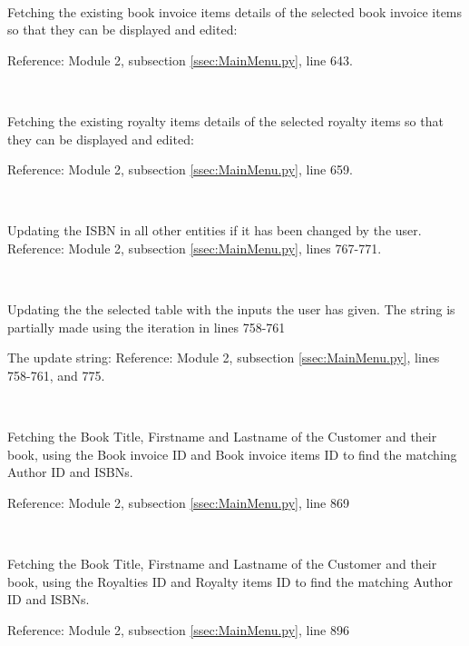 \

Fetching the existing book invoice items details of the selected book invoice items so that they can be displayed and edited:
\begin{tiny}
\end{tiny}
Reference: Module 2,  subsection \ref{ssec:MainMenu.py}, line 643.

\

Fetching the existing royalty items details of the selected royalty items so that they can be displayed and edited:
\begin{tiny}
\end{tiny}
Reference: Module 2,  subsection \ref{ssec:MainMenu.py}, line 659.

\

Updating the ISBN in all other entities if it has been changed by the user.
Reference: Module 2,  subsection \ref{ssec:MainMenu.py}, lines 767-771.

\

Updating the the selected table with the inputs the user has given. The string is partially made using the iteration in lines 758-761


The update string:
Reference: Module 2,  subsection \ref{ssec:MainMenu.py}, lines 758-761, and 775.

\

Fetching the Book Title, Firstname and Lastname of the Customer and their book, using the Book invoice ID and Book invoice items ID to find the matching Author ID and ISBNs.
\begin{scriptsize}
\end{scriptsize}
Reference: Module 2,  subsection \ref{ssec:MainMenu.py}, line 869

\

Fetching the Book Title, Firstname and Lastname of the Customer and their book, using the Royalties ID and Royalty items ID to find the matching Author ID and ISBNs.
\begin{tiny}
\end{tiny}
Reference: Module 2,  subsection \ref{ssec:MainMenu.py}, line 896

